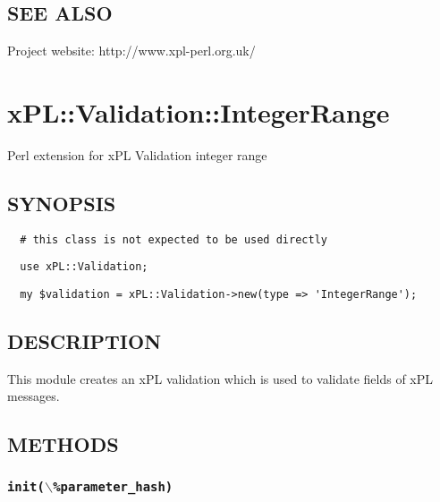 \subsection*{SEE ALSO\label{xPL::Validation::Integer_SEE_ALSO}}


Project website: http://www.xpl-perl.org.uk/

\section{xPL::Validation::IntegerRange\label{xPL::Validation::IntegerRange}}


Perl extension for xPL Validation integer range

\subsection*{SYNOPSIS\label{xPL::Validation::IntegerRange_SYNOPSIS}}
\begin{verbatim}
  # this class is not expected to be used directly
\end{verbatim}
\begin{verbatim}
  use xPL::Validation;
\end{verbatim}
\begin{verbatim}
  my $validation = xPL::Validation->new(type => 'IntegerRange');
\end{verbatim}
\subsection*{DESCRIPTION\label{xPL::Validation::IntegerRange_DESCRIPTION}}


This module creates an xPL validation which is used to validate fields
of xPL messages.

\subsection*{METHODS\label{xPL::Validation::IntegerRange_METHODS}}
\subsubsection*{\texttt{init($\backslash$\%parameter\_hash)}\label{xPL::Validation::IntegerRange_init_backslash_parameter_hash_}}


